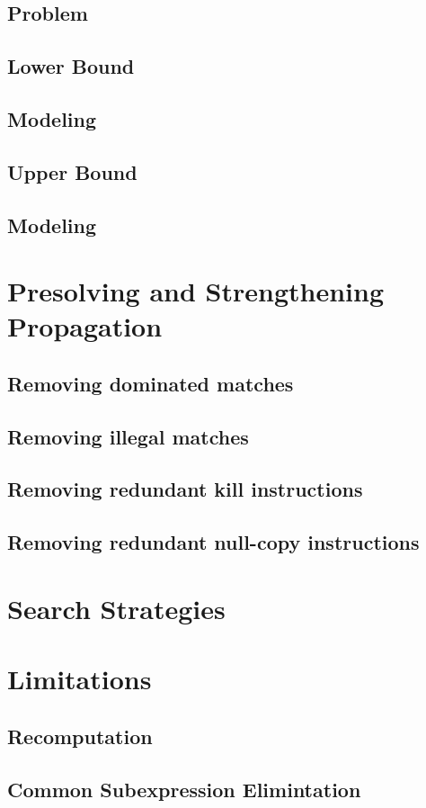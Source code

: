 \documentclass[twoside]{kthdiss}
\begin{document}
\section{Problem}
\section{Lower Bound}
\section{Modeling}
\section{Upper Bound}
\section{Modeling}

\chapter{Presolving and Strengthening Propagation}
\section{Removing dominated matches}
\section{Removing illegal matches}
\section{Removing redundant kill instructions}
\section{Removing redundant null-copy instructions}

\chapter{Search Strategies}

\chapter{Limitations}
\section{Recomputation}
\section{Common Subexpression Elimintation}
\end{document}
